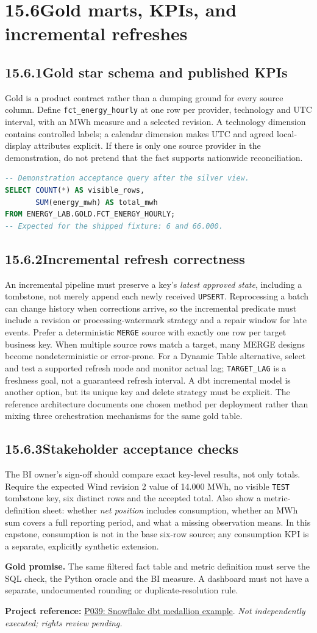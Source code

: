 \documentclass[11pt,twoside]{article}
\newcommand{\topic}[2]{\subsection*{#1\quad #2}}
\newcommand{\repo}[2]{\par\begingroup\fontsize{8.0}{9.6}\selectfont\sffamily\color{inkgray}\textbf{Project reference:} \href{#2}{#1}. \textit{Not independently executed; rights review pending.}\par\endgroup}
\begin{document}
\newpage

\section*{15.6\quad Gold marts, KPIs, and incremental refreshes}
\topic{15.6.1}{Gold star schema and published KPIs}
Gold is a product contract rather than a dumping ground for every source column. Define \texttt{fct\_energy\_hourly} at one row per provider, technology and UTC interval, with an MWh measure and a selected revision. A technology dimension contains controlled labels; a calendar dimension makes UTC and agreed local-display attributes explicit. If there is only one source provider in the demonstration, do not pretend that the fact supports nationwide reconciliation.
\begin{lstlisting}[language=SQL]
-- Demonstration acceptance query after the silver view.
SELECT COUNT(*) AS visible_rows,
       SUM(energy_mwh) AS total_mwh
FROM ENERGY_LAB.GOLD.FCT_ENERGY_HOURLY;
-- Expected for the shipped fixture: 6 and 66.000.
\end{lstlisting}
\topic{15.6.2}{Incremental refresh correctness}
An incremental pipeline must preserve a key's \emph{latest approved state}, including a tombstone, not merely append each newly received \texttt{UPSERT}. Reprocessing a batch can change history when corrections arrive, so the incremental predicate must include a revision or processing-watermark strategy and a repair window for late events. Prefer a deterministic \texttt{MERGE} source with exactly one row per target business key. When multiple source rows match a target, many MERGE designs become nondeterministic or error-prone.
For a Dynamic Table alternative, select and test a supported refresh mode and monitor actual lag; \texttt{TARGET\_LAG} is a freshness goal, not a guaranteed refresh interval. A dbt incremental model is another option, but its unique key and delete strategy must be explicit. The reference architecture documents one chosen method per deployment rather than mixing three orchestration mechanisms for the same gold table.
\topic{15.6.3}{Stakeholder acceptance checks}
The BI owner's sign-off should compare exact key-level results, not only totals. Require the expected Wind revision 2 value of 14.000 MWh, no visible \texttt{TEST} tombstone key, six distinct rows and the accepted total. Also show a metric-definition sheet: whether \emph{net position} includes consumption, whether an MWh sum covers a full reporting period, and what a missing observation means. In this capstone, consumption is not in the base six-row source; any consumption KPI is a separate, explicitly synthetic extension.
\begin{insight}\textbf{Gold promise.} The same filtered fact table and metric definition must serve the SQL check, the Python oracle and the BI measure. A dashboard must not have a separate, undocumented rounding or duplicate-resolution rule.\end{insight}
\repo{P039: Snowflake dbt medallion example}{https://github.com/Jb-Analytics/snowflake-dbt-tpch-medallion}
\end{document}
